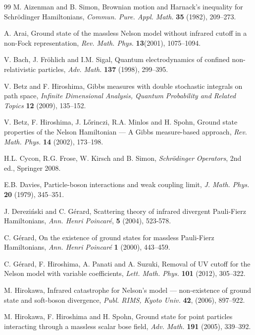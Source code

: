 \documentclass[11pt]{article}
\providecommand{\1}{\mathbb{1}}
\begin{document}
{%
\begin{thebibliography}{99}
M. Aizenman and B. Simon,
Brownian motion and Harnack's inequality for Schr\"odinger Hamiltonians,
{\it Commun. Pure. Appl. Math. }{\bf 35} (1982), 209--273.

A. Arai,
Ground state of the massless Nelson model without infrared cutoff in a non-Fock representation,
{\it Rev. Math. Phys.} {\bf 13}(2001), 1075--1094.

V.  Bach,   J.  Fr\"ohlich and    I.M.  Sigal,
Quantum electrodynamics of confined non-relativistic particles, {\it  Adv. Math. } {\bf 137}
(1998),   299--395.

V. Betz and F. Hiroshima,
Gibbs measures with double stochastic integrals on path space,
{\it Infinite Dimensional Analysis,  Quantum Probability and Related Topics}
{\bf 12} (2009),  135--152.


V.  Betz, F.  Hiroshima,  J.  L\H orinczi, R.A.  Minlos and H.  Spohn,
Ground state properties of the Nelson Hamiltonian --- A Gibbs measure-based approach,
{\it Rev. Math. Phys.} {\bf 14}  (2002), 173--198.


H.L. Cycon, R.G. Frose, W. Kirsch and B. Simon,
{\it Schr\"odinger Operators}, 2nd ed., Springer 2008.

E.B.  Davies,   Particle-boson interactions and weak coupling limit,
{\it  J. Math. Phys.} {\bf 20}  (1979),  345--351.

J. Derezi\'nski and C. G\'erard,
Scattering theory of infrared divergent Pauli-Fierz Hamiltonians,
{\it   Ann. Henri Poincar\'e},  {\bf 5} (2004), 523-578.


C.  G\'erard,
On the existence of ground states for massless Pauli-Fierz Hamiltonians,
{\it Ann.  Henri  Poincar\'e} {\bf 1}  (2000),  443--459.


C. G\'erard, F. Hiroshima, A. Panati and A. Suzuki,
Removal of UV cutoff for the Nelson model with variable coefficients,
{\it Lett. Math. Phys.} {\bf 101} (2012), 305--322.

M. Hirokawa,
Infrared catastrophe for Nelson's model --- non-existence of ground state and soft-boson
divergence, {\it Publ. RIMS, Kyoto Univ.}  \textbf{42},  (2006), 897--922.


M. Hirokawa, F. Hiroshima and H. Spohn,
Ground state for point particles interacting through a massless scalar bose field,
{\it Adv. Math.} {\bf 191} (2005), 339--392.


\end{thebibliography}}
\end{document}
